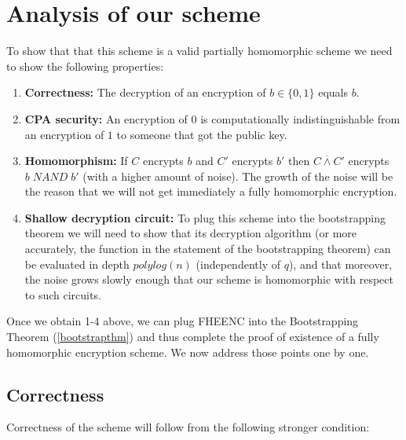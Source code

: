 \section{Analysis of our scheme}\label{15-Analysis-of-our-scheme}

To show that that this scheme is a valid partially homomorphic scheme we
need to show the following properties:

\begin{enumerate}
\def\labelenumi{\arabic{enumi}.}
\item
  \textbf{Correctness:} The decryption of an encryption of
  \(b\in\{0,1\}\) equals \(b\).
\item
  \textbf{CPA security:} An encryption of \(0\) is computationally
  indistinguishable from an encryption of \(1\) to someone that got the
  public key.
\item
  \textbf{Homomorphism:} If \(C\) encrypts \(b\) and \(C'\) encrypts
  \(b'\) then \(C \overline{\wedge} C'\) encrypts
  \(b\; \ensuremath{\mathit{NAND}}\; b'\) (with a higher amount of
  noise). The growth of the noise will be the reason that we will not
  get immediately a fully homomorphic encryption.
\item
  \textbf{Shallow decryption circuit:} To plug this scheme into the
  bootstrapping theorem we will need to show that its decryption
  algorithm (or more accurately, the function in the statement of the
  bootstrapping theorem) can be evaluated in depth \(polylog(n)\)
  (independently of \(q\)), and that moreover, the noise grows slowly
  enough that our scheme is homomorphic with respect to such circuits.
\end{enumerate}

Once we obtain 1-4 above, we can plug FHEENC into the Bootstrapping
Theorem (\cref{bootstrapthm}) and thus complete the proof of existence
of a fully homomorphic encryption scheme. We now address those points
one by one.

\subsection{Correctness}\label{15-Correctness}

Correctness of the scheme will follow from the following stronger
condition:

\hypertarget{fhecorrectlem}{}

